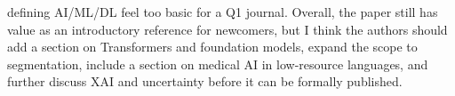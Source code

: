 \documentclass[12pt,a4paper]{article}
\begin{document}
defining AI/ML/DL feel too basic for a Q1 journal. Overall, the paper still has value as an introductory reference for newcomers, but I think the authors should add a section on Transformers and foundation models, expand the scope to segmentation, include a section on medical AI in low-resource languages, and further discuss XAI and uncertainty before it can be formally published.
\end{document}
